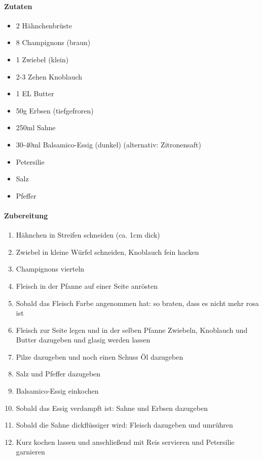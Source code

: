 \newpage
{}
\paragraph{Zutaten}
\begin{itemize}[noitemsep]
	\item 2 Hähnchenbrüste
	\item 8 Champignons (braun)
	\item 1 Zwiebel (klein)
	\item 2-3 Zehen Knoblauch
	\item 1 EL Butter
	\item 50g Erbsen (tiefgefroren)
	\item 250ml Sahne
	\item 30-40ml Balsamico-Essig (dunkel) (alternativ: Zitronensaft)
	\item Petersilie
	\item Salz
	\item Pfeffer
\end{itemize}
\paragraph{Zubereitung}
\begin{enumerate}[noitemsep]
	\item Hähnchen in Streifen schneiden (ca. 1cm dick)
	\item Zwiebel in kleine Würfel schneiden, Knoblauch fein hacken
	\item Champignons vierteln
	\item Fleisch in der Pfanne auf einer Seite anrösten 
	\item Sobald das Fleisch Farbe angenommen hat: so braten, dass es nicht mehr rosa ist
	\item Fleisch zur Seite legen und in der selben Pfanne Zwiebeln, Knoblauch und Butter dazugeben und glasig werden lassen
	\item Pilze dazugeben und noch einen Schuss Öl dazugeben
	\item Salz und Pfeffer dazugeben
	\item Balsamico-Essig einkochen
	\item Sobald das Essig verdampft ist: Sahne und Erbsen dazugeben 	
	\item Sobald die Sahne dickflüssiger wird: Fleisch dazugeben und umrühren
	\item Kurz kochen lassen und anschließend mit Reis servieren und Petersilie garnieren
\end{enumerate}

